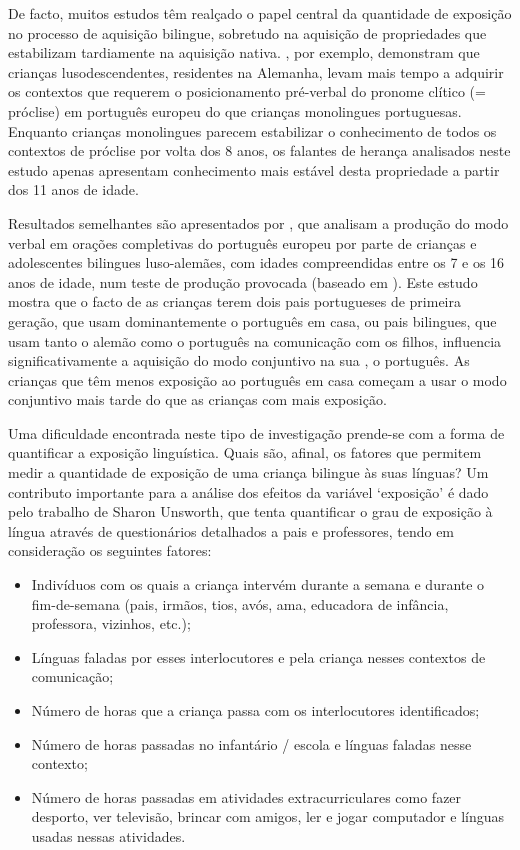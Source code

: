 \documentclass[output=paper]{LSP/langsci}
\begin{document}
\largerpage[2] De facto, muitos estudos têm realçado o papel central da quantidade de exposição no processo de aquisição bilingue, sobretudo na aquisição de propriedades que estabilizam tardiamente na aquisição nativa. \cite{barbosaflores2001}, por exemplo, demonstram que crianças lusodescendentes, residentes na Alemanha, levam mais tempo a adquirir os contextos que requerem o posicionamento pré-verbal do pronome clítico (= próclise) em português europeu do que crianças monolingues portuguesas. Enquanto crianças monolingues parecem estabilizar o conhecimento de todos os contextos de próclise por volta dos 8 anos, os falantes de herança analisados neste estudo apenas apresentam conhecimento mais estável desta propriedade a partir dos 11 anos de idade. 

Resultados semelhantes são apresentados por \cite{flores_etal2016}, que analisam a produção do modo verbal em orações completivas do português europeu por parte de crianças e adolescentes bilingues luso-alemães, com idades compreendidas entre os 7 e os 16 anos de idade, num teste de produção provocada (baseado em \citealt{jesus2014}). Este estudo mostra que o facto de as crianças terem dois pais portugueses de primeira geração, que usam dominantemente o português em casa, ou pais bilingues, que usam tanto o alemão como o português na comunicação com os filhos, influencia significativamente a aquisição do modo conjuntivo na sua , o português. As crianças que têm menos exposição ao português em casa começam a usar o modo conjuntivo mais tarde do que as crianças com mais exposição.

Uma dificuldade encontrada neste tipo de investigação prende-se com a forma de quantificar a exposição linguística. Quais são, afinal, os fatores que permitem medir a quantidade de exposição de uma criança bilingue às suas línguas? Um contributo importante para a análise dos efeitos da variável `exposição' é dado pelo trabalho de Sharon Unsworth, que tenta quantificar o grau de exposição à língua através de questionários detalhados a pais e professores, tendo em consideração os seguintes fatores:

\begin{itemize}
\item Indivíduos com os quais a criança intervém durante a semana e durante o fim-de-semana (pais, irmãos, tios, avós, ama, educadora de infância, professora, vizinhos, etc.); 
\item Línguas faladas por esses interlocutores e pela criança nesses contextos de comunicação;
\item Número de horas que a criança passa com os interlocutores identificados;
\item Número de horas passadas no infantário / escola e línguas faladas nesse contexto;
\item Número de horas passadas em atividades extracurriculares como fazer desporto, ver televisão, brincar com amigos, ler e jogar computador e línguas usadas nessas atividades.
\end{itemize}
\end{document}
